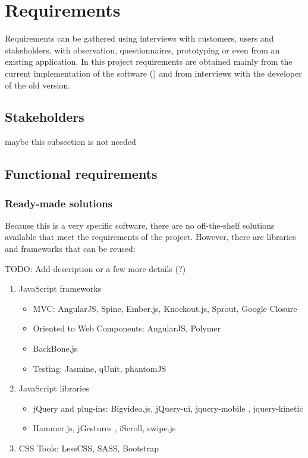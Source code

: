 \chapter{Requirements}
Requirements can be gathered using interviews with customers, users and stakeholders, with observation, questionnaires, prototyping or even from an existing application.
In this project requirements are obtained mainly from the current implementation of the software () and from interviews with the developer of the old version.

\section{Stakeholders}
maybe this subsection is not needed

\section{Functional requirements}

\subsection{Ready-made solutions}
Because this is a very specific software, there are no off-the-shelf solutions available that meet the requirements of the project.
However, there are libraries and frameworks that can be reused:

TODO: Add description or a few more details (?)

\begin{enumerate}
    \item JavaScript frameworks
    \begin{itemize}
        \item MVC: AngularJS, Spine, Ember.js, Knockout.js, Sprout, Google Closure
        \item Oriented to Web Components: AngularJS, Polymer
        \item BackBone.js
    \item Testing: Jasmine, qUnit, phantomJS   
    \end{itemize}
    \item JavaScript libraries
    \begin{itemize}
        \item jQuery and plug-ins: Bigvideo.js, jQuery-ui, jquery-mobile , jquery-kinetic  
        \item Hammer.js, jGestures , iScroll, swipe.js
    \end{itemize} 
    \item CSS Tools: LessCSS, SASS, Bootstrap
\end{enumerate}

